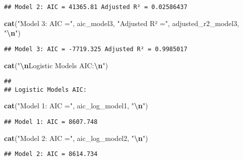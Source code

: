 \documentclass[
]{article}
\newenvironment{Shaded}{\begin{snugshade}}{\end{snugshade}}
\newcommand{\FunctionTok}[1]{\textcolor[rgb]{0.13,0.29,0.53}{\textbf{#1}}}
\newcommand{\NormalTok}[1]{#1}
\newcommand{\SpecialCharTok}[1]{\textcolor[rgb]{0.81,0.36,0.00}{\textbf{#1}}}
\newcommand{\StringTok}[1]{\textcolor[rgb]{0.31,0.60,0.02}{#1}}
\begin{document}
\begin{verbatim}
## Model 2: AIC = 41365.81 Adjusted R² = 0.02586437
\end{verbatim}

\begin{Shaded}
\begin{Highlighting}[]
\FunctionTok{cat}\NormalTok{(}\StringTok{"Model 3: AIC ="}\NormalTok{, aic\_model3, }\StringTok{"Adjusted R² ="}\NormalTok{, adjusted\_r2\_model3, }\StringTok{"}\SpecialCharTok{\textbackslash{}n}\StringTok{"}\NormalTok{)}
\end{Highlighting}
\end{Shaded}

\begin{verbatim}
## Model 3: AIC = -7719.325 Adjusted R² = 0.9985017
\end{verbatim}

\begin{Shaded}
\begin{Highlighting}[]
\FunctionTok{cat}\NormalTok{(}\StringTok{"}\SpecialCharTok{\textbackslash{}n}\StringTok{Logistic Models AIC:}\SpecialCharTok{\textbackslash{}n}\StringTok{"}\NormalTok{)}
\end{Highlighting}
\end{Shaded}

\begin{verbatim}
## 
## Logistic Models AIC:
\end{verbatim}

\begin{Shaded}
\begin{Highlighting}[]
\FunctionTok{cat}\NormalTok{(}\StringTok{"Model 1: AIC ="}\NormalTok{, aic\_log\_model1, }\StringTok{"}\SpecialCharTok{\textbackslash{}n}\StringTok{"}\NormalTok{)}
\end{Highlighting}
\end{Shaded}

\begin{verbatim}
## Model 1: AIC = 8607.748
\end{verbatim}

\begin{Shaded}
\begin{Highlighting}[]
\FunctionTok{cat}\NormalTok{(}\StringTok{"Model 2: AIC ="}\NormalTok{, aic\_log\_model2, }\StringTok{"}\SpecialCharTok{\textbackslash{}n}\StringTok{"}\NormalTok{)}
\end{Highlighting}
\end{Shaded}

\begin{verbatim}
## Model 2: AIC = 8614.734
\end{verbatim}
\end{document}
